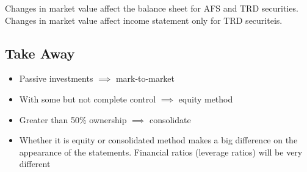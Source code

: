 Changes in market value affect the balance sheet for AFS and TRD securities. Changes in market value affect income statement only for TRD securiteis.

\subsection*{Take Away}
\begin{itemize}[noitemsep,topsep=0pt]
	\item Passive investments  $\implies$ mark-to-market
	\item With some but not complete control  $\implies$ equity method
	\item Greater than 50\%  ownership $\implies$ consolidate
	\item Whether it is equity or consolidated method makes a big difference on the appearance
	of the statements. Financial ratios (leverage ratios) will be very different
\end{itemize}
